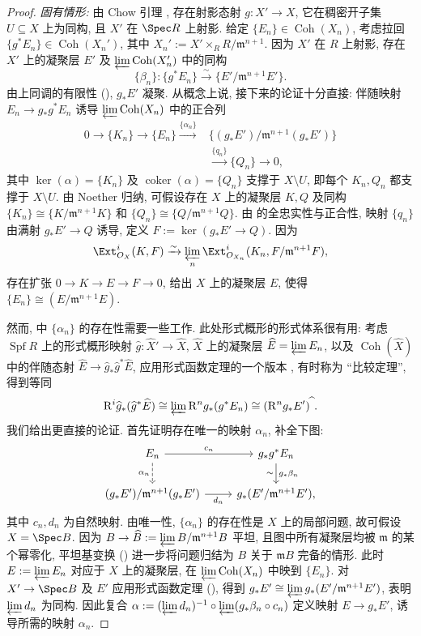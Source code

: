 \begin{proof}
\textit{固有情形:} 由 Chow 引理 \cite[习题 II.4.10]{Har77}, 存在射影态射 $g:X'\to X$, 它在稠密开子集 $U\subseteq X$ 上为同构, 且 $X'$ 在 $\Spec R$ 上射影. 给定 $\{E_n\}\in\operatorname{Coh}(X_n)$, 考虑拉回 $\{g^*E_n\}\in\operatorname{Coh}(X_n')$, 其中 $X_n':=X'\times_RR/\mathfrak m^{n+1}$. 因为 $X'$ 在 $R$ 上射影, 存在 $X'$ 上的凝聚层 $E'$ 及 $\varprojlim\operatorname{Coh}(X_n')$ 中的同构
\[
\{\beta_n\}:\{g^*E_n\}\xrightarrow\sim\{E'/\mathfrak m^{n+1}E'\}.
\]
由上同调的有限性 (), $g_*E'$ 凝聚. 从概念上说, 接下来的论证十分直接: 伴随映射 $E_n\to g_*g^*E_n$ 诱导 $\varprojlim\operatorname{Coh}(X_n)$ 中的正合列
\begin{equation}\label{src:C.5.7}
\begin{aligned}
0\to\{K_n\}\to\{E_n\}\xrightarrow{\{\alpha_n\}}&\{(g_*E')/\mathfrak m^{n+1}(g_*E')\}\\
&\xrightarrow{\{q_n\}}\{Q_n\}\to0,
\end{aligned}
\end{equation}
其中 $\ker(\alpha)=\{K_n\}$ 及 $\operatorname{coker}(\alpha)=\{Q_n\}$ 支撑于 $X\setminus U$, 即每个 $K_n,Q_n$ 都支撑于 $X\setminus U$. 由 Noether 归纳, 可假设存在 $X$ 上的凝聚层 $K,Q$ 及同构 $\{K_n\}\cong\{K/\mathfrak m^{n+1}K\}$ 和 $\{Q_n\}\cong\{Q/\mathfrak m^{n+1}Q\}$. 由  的全忠实性与正合性, 映射 $\{q_n\}$ 由满射 $g_*E'\to Q$ 诱导, 定义 $F:=\ker(g_*E'\to Q)$. 因为
\[
\Ext^i_{\mathcal O_X}(K,F)\xrightarrow\sim\varprojlim_n\Ext^i_{\mathcal O_{X_n}}(K_n,F/\mathfrak m^{n+1}F),
\]
存在扩张 $0\to K\to E\to F\to0$, 给出 $X$ 上的凝聚层 $E$, 使得 $\{E_n\}\cong(E/\mathfrak m^{n+1}E)$.

然而,  中 $\{\alpha_n\}$ 的存在性需要一些工作. 此处形式概形的形式体系很有用: 考虑 $\operatorname{Spf} R$ 上的形式概形映射 $\widehat g:\widehat X'\to\widehat X$, $\widehat X$ 上的凝聚层 $\widehat E=\varprojlim E_n$, 以及 $\operatorname{Coh}(\widehat X)$ 中的伴随态射 $\widehat E\to\widehat g_*\widehat g^*\widehat E$, 应用形式函数定理的一个版本 \cite[III$_1$.4.1.5]{EGA}, 有时称为 ``比较定理'', 得到等同
\[
\mathrm R^i\widehat g_*(\widehat g^*\widehat E)\cong\varprojlim\mathrm R^ng_*(g^*E_n)\cong(\mathrm R^ng_*E')^{\widehat{\ }}.
\]
我们给出更直接的论证. 首先证明存在唯一的映射 $\alpha_n$, 补全下图:
\[
\begin{tikzcd}
E_n\arrow[r,"c_n"]\arrow[d,dashed,"\alpha_n"']&g_*g^*E_n\arrow[d,"g_*\beta_n","\sim"']\\
(g_*E')/\mathfrak m^{n+1}(g_*E')\arrow[r,"d_n"']&g_*(E'/\mathfrak m^{n+1}E'),
\end{tikzcd}
\]
其中 $c_n,d_n$ 为自然映射. 由唯一性, $\{\alpha_n\}$ 的存在性是 $X$ 上的局部问题, 故可假设 $X=\Spec B$. 因为 $B\to\widehat B:=\varprojlim B/\mathfrak m^{n+1}B$ 平坦, 且图中所有凝聚层均被 $\mathfrak m$ 的某个幂零化, 平坦基变换 () 进一步将问题归结为 $B$ 关于 $\mathfrak mB$ 完备的情形. 此时 $E:=\varprojlim E_n$ 对应于 $X$ 上的凝聚层, 在 $\varprojlim\operatorname{Coh}(X_n)$ 中映到 $\{E_n\}$. 对 $X'\to\Spec B$ 及 $E'$ 应用形式函数定理 (), 得到 $g_*E'\cong\varprojlim g_*(E'/\mathfrak m^{n+1}E')$, 表明 $\varprojlim d_n$ 为同构. 因此复合 $\alpha:=(\varprojlim d_n)^{-1}\circ\varprojlim(g_*\beta_n\circ c_n)$ 定义映射 $E\to g_*E'$, 诱导所需的映射 $\alpha_n$.


\end{proof}
